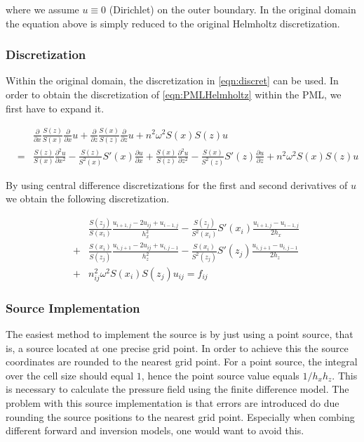 \documentclass[10pt,a4paper]{article}
\begin{document}
where we assume $u\equiv 0$ (Dirichlet) on the outer boundary. In the original domain the equation above is simply reduced to the original Helmholtz discretization.

\subsubsection{Discretization}
Within the original domain, the discretization in \cref{eqn:discret} can be used. In order to obtain the discretization of \cref{eqn:PMLHelmholtz} within the PML, we first have to expand it. 

\begin{eqnarray}
&& \frac{\partial }{\partial x}\frac{S(z)}{S(x)}\frac{\partial }{\partial x}u + \frac{\partial }{\partial z}\frac{S(x)}{S(z)}\frac{\partial }{\partial z}u + n^2\omega^2 S(x)S(z)u\\
&=& \frac{S(z)}{S(x)}\frac{\partial^2 u}{\partial x^2}-\frac{S(z)}{S^2(x)}S'(x)\frac{\partial u}{\partial x} + \frac{S(x)}{S(z)}\frac{\partial^2 u}{\partial z^2}-\frac{S(x)}{S^2(z)}S'(z)\frac{\partial u}{\partial z}+ n^2\omega^2 S(x)S(z)u
\end{eqnarray}

By using central difference discretizations for the first and second derivatives of $u$ we obtain the following discretization.

\begin{eqnarray}
&&\frac{S(z_j)}{S(x_i)}\frac{u_{i+1,j}-2u_{ij}+u_{i-1,j}}{h_x^2}-\frac{S(z_j)}{S^2(x_i)}S'(x_i)\frac{u_{i+1,j}-u_{i-1,j}}{2h_x}\\
&+& \frac{S(x_i)}{S(z_j)}\frac{u_{i,j+1}-2u_{ij}+u_{i,j-1}}{h_z^2}-\frac{S(x_i)}{S^2(z_j)}S'(z_j)\frac{u_{i,j+1}-u_{i,j-1}}{2h_z}\\
&+& n_{ij}^2\omega^2 S(x_i)S(z_j)u_{ij}=f_{ij}
\end{eqnarray}

\subsubsection{Source Implementation}
The easiest method to implement the source is by just using a point source, that is, a source located at one precise grid point. In order to achieve this the source coordinates are rounded to the nearest grid point. For a point source, the integral over the cell size should equal $1$, hence the point source value equals $1/h_xh_z$. This is necessary to calculate the pressure field using the finite difference model. The problem with this source implementation is that errors are introduced do due rounding the source positions to the nearest grid point. Especially when combing different forward and inversion models, one would want to avoid this.\\
\end{document}

